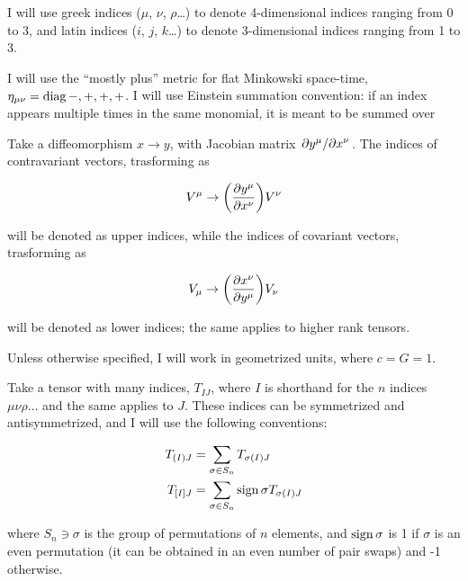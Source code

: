 \documentclass[main.tex]{subfiles}
\begin{document}
I will use greek indices ($\mu$, $\nu$, $\rho$\dots) to denote 4-dimensional indices ranging from 0 to 3, and latin indices ($i$, $j$, $k$\dots) to denote 3-dimensional indices ranging from 1 to 3.

I will use the ``mostly plus'' metric for flat Minkowski space-time, $\eta_{\mu \nu} = \operatorname{diag}{-, +, +, +}$.
I will use Einstein summation convention: if an index appears multiple times in the same monomial, it is meant to be summed over

Take a diffeomorphism $x \rightarrow y$, with Jacobian matrix $\pdv*{y^\mu}{x^\nu}$.
The indices of contravariant vectors, trasforming as

\begin{equation}
    V^\mu \rightarrow \qty( \pdv{y^\mu}{x^\nu})  V^\nu
\end{equation}

will be denoted as upper indices, while the indices of covariant vectors, trasforming as

\begin{equation}
V_\mu \rightarrow \qty( \pdv{x^\nu}{y^\mu})  V_\nu
\end{equation}

will be denoted as lower indices; the same applies to higher rank tensors.

Unless otherwise specified, I will work in geometrized units, where $c = G = 1$.

Take a tensor with many indices, $T_{IJ}$, where $I$ is shorthand for the $n$ indices $\mu \nu \rho \dots$ and the same applies to $J$. These indices can be symmetrized and antisymmetrized, and I will use the following conventions:

\begin{align}
    T_{(I)J} &= \sum_{\sigma \in S_n} T_{\sigma(I)J} \\
    T_{[I]J} &= \sum_{\sigma \in S_n} \operatorname{sign}{\sigma} T_{\sigma(I)J}
\end{align}

where $S_n \ni \sigma $ is the group of permutations of $n$ elements, and $\operatorname{sign}{\sigma}$ is 1 if $\sigma$ is an even permutation (it can be obtained in an even number of pair swaps) and -1 otherwise.
\end{document}
